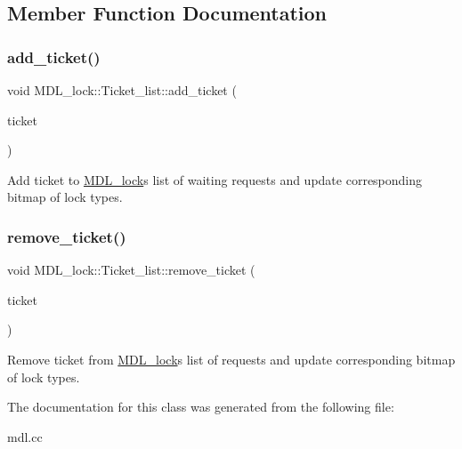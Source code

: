 \subsection{Member Function Documentation}
\mbox{\label{classMDL__lock_1_1Ticket__list_ae1ec50de835e397d9c56b010fb894dfb}} 
\subsubsection{\texorpdfstring{add\+\_\+ticket()}{add\_ticket()}}
{\footnotesize\ttfamily void M\+D\+L\+\_\+lock\+::\+Ticket\+\_\+list\+::add\+\_\+ticket (\begin{DoxyParamCaption}\item[{\mbox{\hyperlink{classMDL__ticket}{M\+D\+L\+\_\+ticket}} $\ast$}]{ticket }\end{DoxyParamCaption})}

Add ticket to \mbox{\hyperlink{classMDL__lock}{M\+D\+L\+\_\+lock}}\textquotesingle{}s list of waiting requests and update corresponding bitmap of lock types. \mbox{\label{classMDL__lock_1_1Ticket__list_ac6cdf2ddde468fcdf268b9d5a2a30200}} 
\subsubsection{\texorpdfstring{remove\+\_\+ticket()}{remove\_ticket()}}
{\footnotesize\ttfamily void M\+D\+L\+\_\+lock\+::\+Ticket\+\_\+list\+::remove\+\_\+ticket (\begin{DoxyParamCaption}\item[{\mbox{\hyperlink{classMDL__ticket}{M\+D\+L\+\_\+ticket}} $\ast$}]{ticket }\end{DoxyParamCaption})}

Remove ticket from \mbox{\hyperlink{classMDL__lock}{M\+D\+L\+\_\+lock}}\textquotesingle{}s list of requests and update corresponding bitmap of lock types. 

The documentation for this class was generated from the following file\+:\begin{DoxyCompactItemize}
\item 
mdl.\+cc\end{DoxyCompactItemize}
